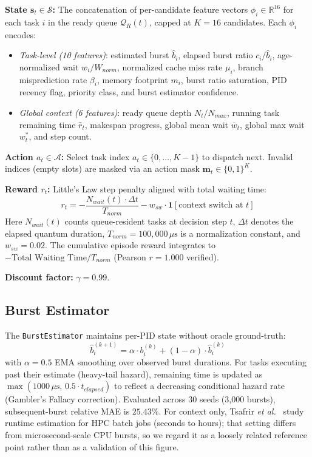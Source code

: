 \smallskip
\noindent\textbf{State $\mathbf{s}_t \in \mathcal{S}$:} The concatenation of per-candidate
feature vectors $\phi_i \in \mathbb{R}^{16}$ for each task $i$ in the ready
queue $\mathcal{Q}_R(t)$, capped at $K = 16$ candidates. Each $\phi_i$
encodes:
\begin{itemize}
  \item \textit{Task-level (10 features)}: estimated burst $\hat{b}_i$, elapsed
    burst ratio $c_i/\hat{b}_i$, age-normalized wait $w_i/W_{norm}$,
    normalized cache miss rate $\mu_i$, branch misprediction rate
    $\beta_i$, memory footprint $m_i$, burst ratio saturation, PID
    recency flag, priority class, and burst estimator confidence.
  \item \textit{Global context (6 features)}: ready queue depth $N_t/N_{max}$,
    running task remaining time $\hat{r}_t$, makespan progress, global mean
    wait $\bar{w}_t$, global max wait $w^*_t$, and step count.
\end{itemize}

\smallskip
\noindent\textbf{Action $a_t \in \mathcal{A}$:} Select task index $a_t \in \{0,\ldots,K-1\}$ to dispatch next. Invalid indices (empty slots) are
masked via an action mask $\mathbf{m}_t \in \{0,1\}^K$.

\smallskip
\noindent\textbf{Reward $r_t$:} Little's Law step penalty aligned with total waiting time:
\begin{equation}
  r_t = -\frac{N_{wait}(t) \cdot \Delta t}{T_{norm}} - w_{sw} \cdot
  \mathbf{1}[\text{context switch at } t]
  \label{eq:reward}
\end{equation}
Here $N_{wait}(t)$ counts queue-resident tasks at decision step $t$,
$\Delta t$ denotes the elapsed quantum duration, $T_{norm} = 100{,}000\,\mu\text{s}$ is a normalization constant,
and $w_{sw} = 0.02$. The cumulative episode reward integrates to
$-\text{Total Waiting Time}/T_{norm}$ (Pearson $r = 1.000$ verified).

\smallskip
\noindent\textbf{Discount factor:} $\gamma = 0.99$.

\subsection{Burst Estimator}
\label{subsec:burst_est}

The \texttt{BurstEstimator} maintains per-PID state without oracle ground-truth:
\begin{equation}
  \hat{b}^{(k+1)}_i = \alpha \cdot b^{(k)}_i + (1-\alpha) \cdot \hat{b}^{(k)}_i
\end{equation}
with $\alpha = 0.5$ EMA smoothing over observed burst durations. For tasks
executing past their estimate (heavy-tail hazard), remaining time is updated as
$\max(1000\,\mu\text{s},\, 0.5 \cdot t_{elapsed})$ to reflect a
decreasing conditional hazard rate (Gambler's Fallacy correction). Evaluated
across 30 seeds (3{,}000 bursts), subsequent-burst relative MAE is $25.43\%$. For context only,
Tsafrir \textit{et al.}~\cite{Tsafrir2007} study runtime estimation for HPC
batch jobs (seconds to hours); that setting differs from microsecond-scale CPU
bursts, so we regard it as a loosely related reference point rather than as a
validation of this figure.

